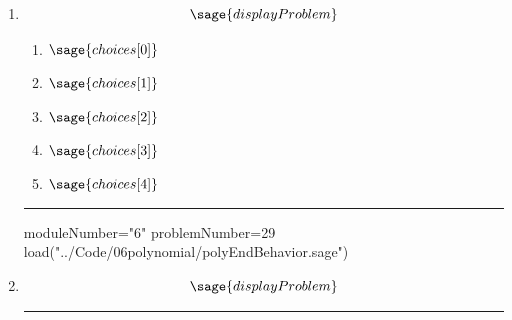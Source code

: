 \documentclass[14pt]{extbook}
\newcommand{\litem}[1]{\item#1\hspace*{-1cm}\rule{\textwidth}{0.4pt}}
\begin{document}
\begin{enumerate}
\litem{ 

   \[ \sage{displayProblem} \]

  	\begin{enumerate}[label=\Alph*.]
    \item \( \sage{choices[0]} \)
    \item \( \sage{choices[1]} \)
    \item \( \sage{choices[2]} \)
    \item \( \sage{choices[3]} \)
    \item \( \sage{choices[4]} \)
  	\end{enumerate}
  }

\begin{sagesilent}
moduleNumber="6"
problemNumber=29
load("../Code/06polynomial/polyEndBehavior.sage")
\end{sagesilent}

\litem{ 

\[ \sage{displayProblem} \]

}
\end{enumerate}
\end{document}

